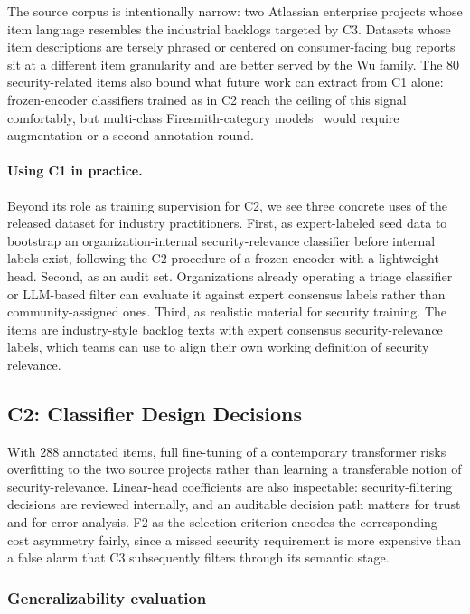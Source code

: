 The source corpus is intentionally narrow: two Atlassian enterprise projects whose item language resembles the industrial backlogs targeted by C3.
Datasets whose item descriptions are tersely phrased or centered on consumer-facing bug reports sit at a different item granularity and are better served by the Wu family.
The $80$ security-related items also bound what future work can extract from C1 alone: frozen-encoder classifiers trained as in C2 reach the ceiling of this signal comfortably, but multi-class Firesmith-category models~\cite{firesmith2004specifying} would require augmentation or a second annotation round.

\paragraph{Using C1 in practice.}
Beyond its role as training supervision for C2, we see three concrete uses of the released dataset for industry practitioners.
First, as expert-labeled seed data to bootstrap an organization-internal security-relevance classifier before internal labels exist, following the C2 procedure of a frozen encoder with a lightweight head.
Second, as an audit set. Organizations already operating a triage classifier or LLM-based filter can evaluate it against expert consensus labels rather than community-assigned ones.
Third, as realistic material for security training. The items are industry-style backlog texts with expert consensus security-relevance labels, which teams can use to align their own working definition of security relevance.

\subsection*{C2: Classifier Design Decisions}\label{sec:discussion-c2}

With $288$ annotated items, full fine-tuning of a contemporary transformer risks overfitting to the two source projects rather than learning a transferable notion of security-relevance.
Linear-head coefficients are also inspectable: security-filtering decisions are reviewed internally, and an auditable decision path matters for trust and for error analysis.
F2 as the selection criterion encodes the corresponding cost asymmetry fairly, since a missed security requirement is more expensive than a false alarm that C3 subsequently filters through its semantic stage.


\subsubsection*{Generalizability evaluation}\label{sec:discussion-c2-generalizability}


